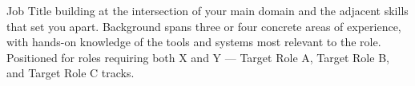 Job Title building at the intersection of your main domain and the adjacent skills that set you apart. Background spans three or four concrete areas of experience, with hands-on knowledge of the tools and systems most relevant to the role. Positioned for roles requiring both X and Y --- Target Role A, Target Role B, and Target Role C tracks.
